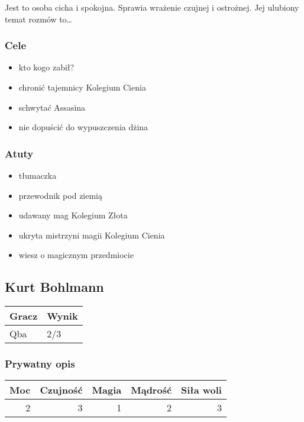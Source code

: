 \documentclass[11pt]{article}
\begin{document}
    Jest to osoba cicha i spokojna. Sprawia wrażenie czujnej i
    ostrożnej. Jej ulubiony temat rozmów to\ldots{}
\subsubsection*{Cele}
\label{sec-3.3.3}

\begin{itemize}
\item kto kogo zabił?
\item chronić tajemnicy Kolegium Cienia
\item schwytać Assasina
\item nie dopuścić do wypuszczenia dżina
\end{itemize}
\subsubsection*{Atuty}
\label{sec-3.3.4}

\begin{itemize}
\item tłumaczka
\item przewodnik pod ziemią
\item udawany mag Kolegium Złota
\item ukryta mistrzyni magii Kolegium Cienia
\item wiesz o magicznym przedmiocie
\end{itemize}
\subsection*{Kurt Bohlmann}
\label{sec-3.4}


\begin{center}
\begin{tabular}{ll}
 Gracz  &  Wynik  \\
\hline
 Qba    &  2/3    \\
\end{tabular}
\end{center}


\subsubsection*{Prywatny opis}
\label{sec-3.4.1}


\begin{center}
\begin{tabular}{rrrrr}
 Moc  &  Czujność  &  Magia  &  Mądrość  &  Siła woli  \\
\hline
   2  &         3  &      1  &        2  &          3  \\
\end{tabular}
\end{center}
\end{document}
